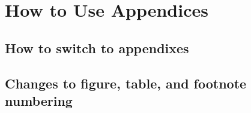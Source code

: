 \chapter{How to Use Appendices}


\section{How to switch to appendixes}


\section{Changes to figure, table, and footnote numbering}
